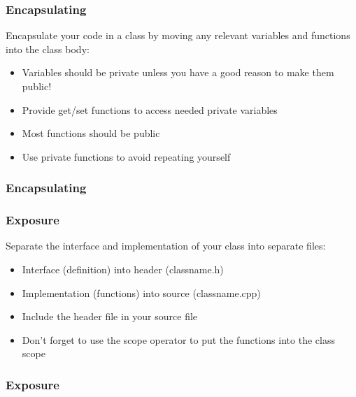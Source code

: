 \begin{frame}[fragile]
	\frametitle{Encapsulating}
	Encapsulate your code in a class by moving any relevant variables and functions into the class body:
	\begin{itemize}
		\item Variables should be private unless you have a good reason to make them public!
		\item Provide get/set functions to access needed private variables
		\item Most functions should be public
		\item Use private functions to avoid repeating yourself
	\end{itemize}
\end{frame}

\begin{frame}[fragile]
	\frametitle{Encapsulating}
	
\end{frame}

\begin{frame}
	\frametitle{Exposure}
	Separate the interface and implementation of your class into separate files:
	\begin{itemize}
		\item Interface (definition) into header (classname.h)
		\item Implementation (functions) into source (classname.cpp)
		\item Include the header file in your source file
		\item Don't forget to use the scope operator to put the functions into the class scope
	\end{itemize}
\end{frame}

\begin{frame}[fragile]
	\frametitle{Exposure}
	\begin{columns}[T]
		\begin{column}{0.5\textwidth}
			
		\end{column}
		\begin{column}{0.5\textwidth}
			
		\end{column}
	\end{columns}
\end{frame}

